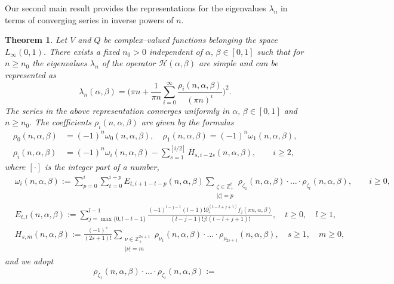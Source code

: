 \documentclass[10pt, a4paper]{article}
\theoremstyle{plain}
\newtheorem{theorem}{Theorem}
\theoremstyle{definition}
\numberwithin{equation}{section}
\def\l{\lambda}
\def\p{\partial}
\def\a{\alpha}
\def\b{\beta}
\begin{document}
Our second main result provides the representations for the eigenvalues $\l_n$ in terms of converging series  in inverse powers of $n$.

\begin{theorem}\label{th1}
Let $V$ and $Q$ be complex--valued functions belonging the space $L_\infty (0, 1)$. There exists a fixed $n_0>0$ independent of $\a,\,\b\in[0,1]$ such that for $n\geqslant n_0$ the eigenvalues $\lambda_n$ of the operator $\mathcal{H}(\alpha, \beta)$ are simple and can be represented as
\begin{equation}\label{prom11z}
\lambda_n(\a,\b)=\Bigg(\pi n+\frac{1}{\pi n}\sum\limits_{i=0}^\infty\frac{\rho_i(n,\alpha, \beta)}{(\pi n)^i}\Bigg)^2.
\end{equation}
The series in the above representation converges uniformly in $\alpha,\, \beta\in[0,1]$ and $n\geqslant n_0.$ The coefficients
$\rho_i(n,\alpha, \beta)$  are given by the formulas
\begin{equation}\label{polDi}
\begin{aligned}
\rho_0(n,\alpha, \beta) &= (-1)^n\omega_0(n,\alpha, \beta), \quad
\rho_1(n,\alpha, \beta)=(-1)^n\omega_1(n,\alpha, \beta), \\
\rho_i(n,\alpha, \beta) &= (-1)^n\omega_i(n,\alpha, \beta)-\sum\limits_{s=1}^{[i/2]} H_{s, i-2s}(n,\a,\b),
\qquad i\geqslant 2,
\end{aligned}
\end{equation}
where $[\cdot]$ is the integer part of a number,
\begin{align}\label{Gp}
&\omega_i(n,\alpha, \beta):=\sum\limits_{p=0}^i\sum\limits_{t=0}^{i-p}E_{t, i+1-t-p}(n,\a,\b)
\sum\limits_{\substack{\zeta\in\mathds{Z}_+^t \\ |\zeta|=p}}
\rho_{\zeta_1}(n,\a,\b)\cdot\dots\cdot\rho_{\zeta_t}(n,\a,\b),
\qquad i\geqslant 0,
\\
&\label{Etl}
E_{t, l}(n,\a,\b):=\sum\limits_{j=\max\{0, l-t-1\}}^{l-1}\frac{(-1)^{l-j-1}(l-1)!
 \p_z^{(t-l+j+1)}f_j(\pi n,\a,\b)}{(l-j-1)!j!(t-l+j+1)!}, \quad t\geqslant 0, \quad l\geqslant 1,
\\
&\label{Hsm}
H_{s, m}(n,\a,\b):=\frac{(-1)^s}{(2s+1)!}\sum\limits_{\substack{\nu\in\mathds{Z}_+^{2s+1} \\ |\nu|=m}}
\rho_{\nu_1}(n,\a,\b)\cdot\ldots\cdot\rho_{\nu_{2s+1}}(n,\a,\b),
\quad s\geqslant 1, \quad m\geqslant 0,
\end{align}
and we adopt
\begin{equation}
\rho_{\zeta_1}(n,\a,\b)\cdot\ldots\cdot\rho_{\zeta_t}(n,\a,\b):=

\end{equation}
\end{theorem}
\end{document}
